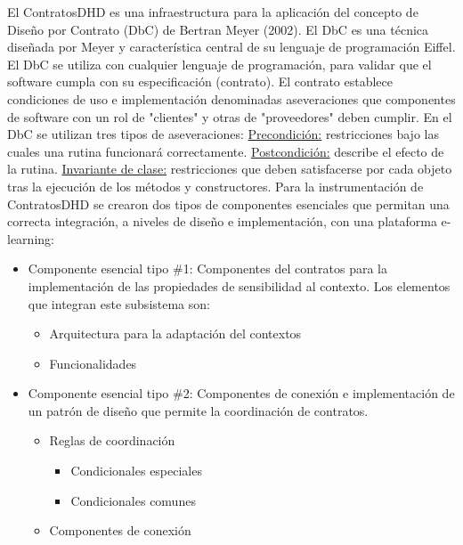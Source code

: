 {\begin{defi} [ContratoDHD]
El ContratosDHD es una infraestructura para la aplicación del concepto de Diseño por Contrato (DbC) de Bertran Meyer (2002). El DbC es una técnica diseñada por Meyer y característica central de su lenguaje de programación Eiffel\cite{Meyer}. El DbC se utiliza con cualquier lenguaje de programación, para validar que el software cumpla con su especificación (contrato). El contrato establece condiciones de uso e implementación denominadas aseveraciones que componentes de software con un rol de "clientes" y otras de "proveedores" deben cumplir. En el DbC se utilizan tres tipos de aseveraciones: \underline{Precondición:} restricciones bajo las cuales una rutina funcionará correctamente.  \underline{Postcondición:} describe el efecto de la rutina. \underline{Invariante de clase:} restricciones que deben satisfacerse por cada objeto tras la ejecución de los métodos y constructores. 
Para la instrumentación de ContratosDHD se crearon dos tipos de componentes esenciales que permitan una correcta integración, a niveles de diseño e implementación, con una plataforma e-learning:

\begin{itemize} \label{CEC}

 \item Componente esencial tipo \#1: Componentes del contratos para la implementación de las
propiedades de sensibilidad al contexto. Los elementos que integran este
subsistema son:
 
      \begin{itemize}
       \item Arquitectura para la adaptación del contextos
       \item Funcionalidades 
      \end{itemize}
      
  \item Componente esencial tipo \#2: Componentes de conexión e implementación de un patrón de
dise\~no que permite la coordinación de contratos.
	    \begin{itemize}
	    \item Reglas de coordinación
		  
		  \begin{itemize}
		   \item Condicionales especiales
		   \item Condicionales comunes 
		  \end{itemize}
	    \item Componentes de conexión
	    \end{itemize}
\end{itemize}
\end{defi} 



}
